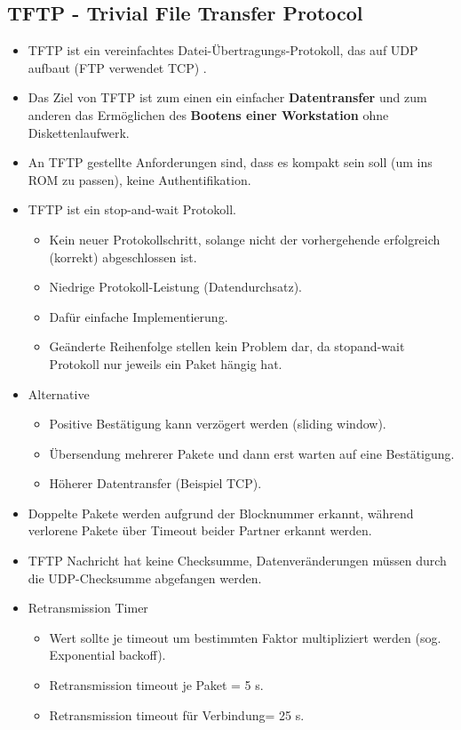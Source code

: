\documentclass{article} %
\begin{document}
	\subsection{TFTP - Trivial File Transfer Protocol}
	\begin{itemize}
		\item TFTP ist ein vereinfachtes Datei-Übertragungs-Protokoll, das auf UDP aufbaut (FTP verwendet TCP) \cite{rfc1350}.
		\item Das Ziel von TFTP ist zum einen ein einfacher \textbf{Datentransfer} und zum anderen das Ermöglichen des \textbf{Bootens einer Workstation} ohne Diskettenlaufwerk.
		\item An TFTP gestellte Anforderungen sind, dass es kompakt sein soll (um ins ROM zu passen), keine Authentifikation.
		\item TFTP ist ein stop-and-wait Protokoll.
		\begin{itemize}
			\item Kein neuer Protokollschritt, solange nicht der vorhergehende erfolgreich (korrekt) abgeschlossen ist.
			\item Niedrige Protokoll-Leistung (Datendurchsatz).
			\item Dafür einfache Implementierung.
			\item Geänderte Reihenfolge stellen kein Problem dar, da stopand-wait Protokoll nur jeweils ein Paket hängig hat.
		\end{itemize}
		\item Alternative
		\begin{itemize}
			\item Positive Bestätigung kann verzögert werden (sliding window).
			\item Übersendung mehrerer Pakete und dann erst warten auf eine Bestätigung.
			\item Höherer Datentransfer (Beispiel TCP).
		\end{itemize}
		\item Doppelte Pakete werden aufgrund der Blocknummer erkannt, während verlorene Pakete über Timeout beider Partner erkannt werden.
		\item TFTP Nachricht hat keine Checksumme, Datenveränderungen müssen durch die UDP-Checksumme abgefangen werden.
		\item Retransmission Timer
		\begin{itemize}
			\item Wert sollte je timeout um bestimmten Faktor multipliziert werden (sog. Exponential backoff).
			\item Retransmission timeout je Paket = 5 s.
			\item Retransmission timeout für \glqq Verbindung\grqq = 25 s.
		\end{itemize}
	\end{itemize}
\end{document}
